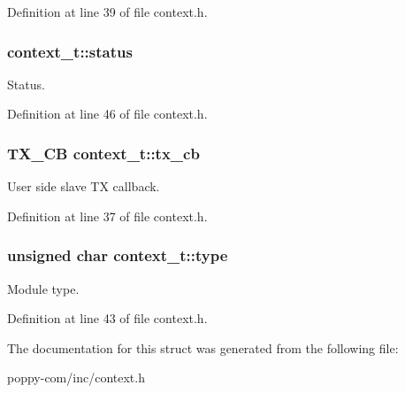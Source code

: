 \-Definition at line 39 of file context.\-h.

\hypertarget{structcontext__t_a0e49b82a79be5df63399ddbcc0cc022c}{
\subsubsection[{status}]{ {\bf context\-\_\-t\-::status}}}\label{structcontext__t_a0e49b82a79be5df63399ddbcc0cc022c}
\-Status. 

\-Definition at line 46 of file context.\-h.

\hypertarget{structcontext__t_a06d2b435c29a01be998e6383fec2ef50}{
\subsubsection[{tx\-\_\-cb}]{\setlength{\rightskip}{0pt plus 5cm}\-T\-X\-\_\-\-C\-B {\bf context\-\_\-t\-::tx\-\_\-cb}}}\label{structcontext__t_a06d2b435c29a01be998e6383fec2ef50}
\-User side slave \-T\-X callback. 

\-Definition at line 37 of file context.\-h.

\hypertarget{structcontext__t_a2dbb966924ef90bfba1876ad8a3872af}{
\subsubsection[{type}]{\setlength{\rightskip}{0pt plus 5cm}unsigned char {\bf context\-\_\-t\-::type}}}\label{structcontext__t_a2dbb966924ef90bfba1876ad8a3872af}
\-Module type. 

\-Definition at line 43 of file context.\-h.



\-The documentation for this struct was generated from the following file\-:\begin{DoxyCompactItemize}
\item 
poppy-\/com/inc/context.\-h\end{DoxyCompactItemize}
